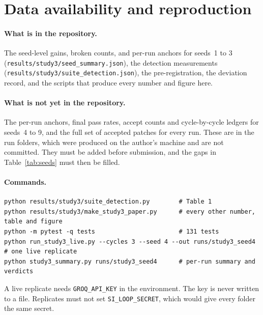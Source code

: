 \documentclass[11pt]{article}
\begin{document}
\section{Data availability and reproduction}
\label{sec:repro}

\paragraph{What is in the repository.} The seed-level gains, broken counts, and per-run anchors for seeds~1 to 3 (\texttt{results/study3/seed\_summary.json}), the detection measurements (\texttt{results/study3/suite\_detection.json}), the pre-registration, the deviation record, and the scripts that produce every number and figure here.
\paragraph{What is not yet in the repository.} The per-run anchors, final pass rates, accept counts and cycle-by-cycle ledgers for seeds~4 to 9, and the full set of accepted patches for every run. These are in the run folders, which were produced on the author's machine and are not committed. They must be added before submission, and the gaps in Table~\ref{tab:seeds} must then be filled.

\paragraph{Commands.}
\begin{verbatim}
python results/study3/suite_detection.py        # Table 1
python results/study3/make_study3_paper.py      # every other number, table and figure
python -m pytest -q tests                       # 131 tests
python run_study3_live.py --cycles 3 --seed 4 --out runs/study3_seed4   # one live replicate
python study3_summary.py runs/study3_seed4      # per-run summary and verdicts
\end{verbatim}
A live replicate needs \texttt{GROQ\_API\_KEY} in the environment. The key is never written to a file. Replicates must not set \texttt{SI\_LOOP\_SECRET}, which would give every folder the same secret.
\end{document}
